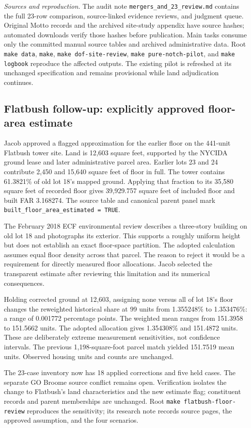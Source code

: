 \textit{Sources and reproduction.} The audit note
\texttt{mergers\_and\_23\_review.md} contains the full 23-row comparison,
source-linked evidence reviews, and judgment queue. Original Motto records
and the archived site-study appendix have source hashes; automated downloads
verify those hashes before publication. Main tasks consume only the committed
manual source tables and archived administrative data. Root \texttt{make data},
\texttt{make}, \texttt{make dof-site-review}, \texttt{make pure-notch-pilot}, and
\texttt{make logbook} reproduce the affected outputs. The existing pilot is
refreshed at its unchanged specification and remains provisional while land
adjudication continues.


\clearpage
\subsection*{Flatbush follow-up: explicitly approved floor-area estimate}

Jacob approved a flagged approximation for the earlier floor on the 441-unit
Flatbush tower site. Land is 12,603 square feet, supported by the NYCIDA ground
lease and later administrative parcel area. Earlier lots 23 and 24 contribute
2,450 and 15,640 square feet of floor in full. The tower contains 61.3821\%
of old lot 18's mapped ground. Applying that fraction to its 35,580 square
feet of recorded floor gives 39,929.757 square feet of included floor and
built FAR 3.168274. The source table and canonical parent panel mark
\texttt{built\_floor\_area\_estimated = TRUE}.

The February 2018 ECF environmental review describes a three-story building
on old lot 18 and photographs its exterior. This supports a roughly uniform
height but does not establish an exact floor-space partition. The adopted
calculation assumes equal floor density across that parcel. The reason to
reject it would be a requirement for directly measured floor allocations.
Jacob selected the transparent estimate after reviewing this limitation and
its numerical consequences.

Holding corrected ground at 12,603, assigning none versus all of lot 18's
floor changes the reweighted historical share at 99 units from 1.355248\%
to 1.353476\%: a range of 0.001772 percentage points. The weighted mean ranges
from 151.3958 to 151.5662 units. The adopted allocation gives 1.354308\% and
151.4872 units. These are deliberately extreme measurement sensitivities,
not confidence intervals. The previous 1,198-square-foot parcel match yielded
151.7519 mean units. Observed housing units and counts are unchanged.

The 23-case inventory now has 18 applied corrections and five held cases.
The separate GO Broome source conflict remains open. Verification isolates
the change to Flatbush's land characteristics and the new estimate flag;
constituent records and parent memberships are unchanged. Root
\texttt{make flatbush-floor-review} reproduces the sensitivity; its research
note records source pages, the approved assumption, and the four scenarios.
